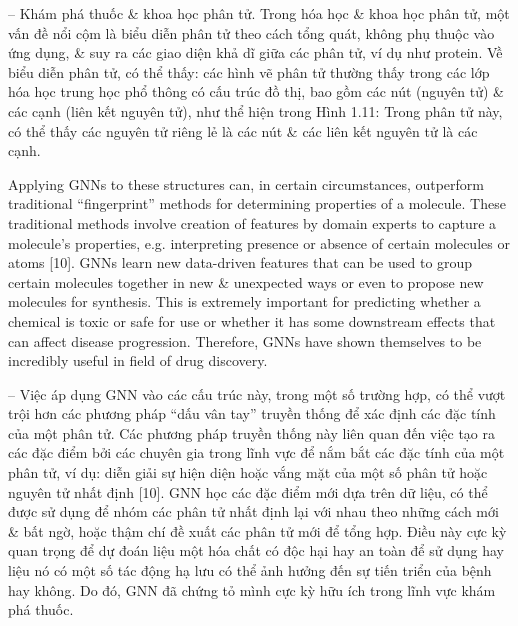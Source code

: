 \documentclass{article}
\begin{document}
\begin{itemize}
\begin{itemize}
\begin{itemize}
            -- {\sf Khám phá thuốc \& khoa học phân tử.} Trong hóa học \& khoa học phân tử, một vấn đề nổi cộm là biểu diễn phân tử theo cách tổng quát, không phụ thuộc vào ứng dụng, \& suy ra các giao diện khả dĩ giữa các phân tử, ví dụ như protein. Về biểu diễn phân tử, có thể thấy: các hình vẽ phân tử thường thấy trong các lớp hóa học trung học phổ thông có cấu trúc đồ thị, bao gồm các nút (nguyên tử) \& các cạnh (liên kết nguyên tử), như thể hiện trong {\sf Hình 1.11: Trong phân tử này, có thể thấy các nguyên tử riêng lẻ là các nút \& các liên kết nguyên tử là các cạnh.}

            Applying GNNs to these structures can, in certain circumstances, outperform traditional ``fingerprint'' methods for determining properties of a molecule. These traditional methods involve creation of features by domain experts to capture a molecule's properties, e.g. interpreting presence or absence of certain molecules or atoms [10]. GNNs learn new data-driven features that can be used to group certain molecules together in new \& unexpected ways or even to propose new molecules for synthesis. This is extremely important for predicting whether a chemical is toxic or safe for use or whether it has some downstream effects that can affect disease progression. Therefore, GNNs have shown themselves to be incredibly useful in field of drug discovery.

            -- Việc áp dụng GNN vào các cấu trúc này, trong một số trường hợp, có thể vượt trội hơn các phương pháp ``dấu vân tay'' truyền thống để xác định các đặc tính của một phân tử. Các phương pháp truyền thống này liên quan đến việc tạo ra các đặc điểm bởi các chuyên gia trong lĩnh vực để nắm bắt các đặc tính của một phân tử, ví dụ: diễn giải sự hiện diện hoặc vắng mặt của một số phân tử hoặc nguyên tử nhất định [10]. GNN học các đặc điểm mới dựa trên dữ liệu, có thể được sử dụng để nhóm các phân tử nhất định lại với nhau theo những cách mới \& bất ngờ, hoặc thậm chí đề xuất các phân tử mới để tổng hợp. Điều này cực kỳ quan trọng để dự đoán liệu một hóa chất có độc hại hay an toàn để sử dụng hay liệu nó có một số tác động hạ lưu có thể ảnh hưởng đến sự tiến triển của bệnh hay không. Do đó, GNN đã chứng tỏ mình cực kỳ hữu ích trong lĩnh vực khám phá thuốc.


\end{itemize}
\end{itemize}
\end{itemize}
\end{document}
